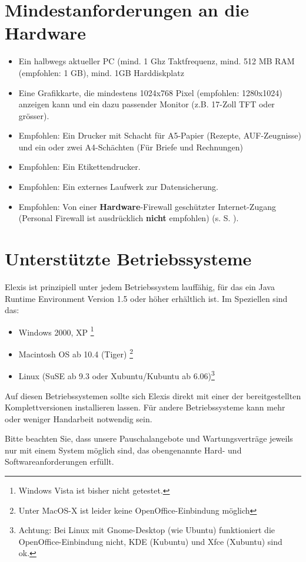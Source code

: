 %

\section{Mindestanforderungen an die Hardware}
\label{systemvoraussetzungen}
\begin{itemize}
 \item Ein halbwegs aktueller PC (mind. 1 Ghz Taktfrequenz, mind. 512 MB RAM
 (empfohlen: 1 GB), mind. 1GB Harddiskplatz
\item  Eine Grafikkarte, die mindestens 1024x768 Pixel (empfohlen: 1280x1024)
anzeigen kann und ein dazu passender Monitor (z.B. 17-Zoll TFT oder grösser).
\item Empfohlen: Ein Drucker mit Schacht für A5-Papier (Rezepte, AUF-Zeugnisse) und ein oder zwei A4-Schächten (Für Briefe und Rechnungen)
\item Empfohlen: Ein Etikettendrucker.
\item Empfohlen: Ein externes Laufwerk zur Datensicherung.
\item Empfohlen: Von einer \textbf{Hardware}-Firewall geschützter Internet-Zugang (Personal Firewall ist ausdrücklich \textbf{nicht} empfohlen) (s. S. \pageref{sicherheit}).
\end{itemize}

\section{Unterstützte Betriebssysteme}
Elexis ist prinzipiell unter jedem Betriebssystem lauffähig, für das ein Java Runtime Environment Version 1.5
oder höher erhältlich ist. Im Speziellen sind das:
\begin{itemize}
\item  Windows 2000, XP \footnote{Windows Vista ist bisher nicht getestet.}
\item  Macintosh OS ab 10.4 (Tiger)  \footnote{Unter MacOS-X ist leider keine
OpenOffice-Einbindung möglich}
\item Linux (SuSE ab 9.3 oder Xubuntu/Kubuntu ab 6.06)\footnote{Achtung: Bei Linux mit Gnome-Desktop (wie Ubuntu) funktioniert die OpenOffice-Einbindung nicht, KDE (Kubuntu) und Xfce (Xubuntu) sind ok.}
\end{itemize}
Auf diesen Betriebssystemen sollte sich Elexis direkt mit einer der bereitgestellten Komplettversionen installieren lassen. Für andere Betriebssysteme kann mehr oder weniger Handarbeit notwendig sein.

Bitte beachten Sie, dass unsere Pauschalangebote und Wartungsverträge jeweils nur mit einem System möglich sind, das obengenannte Hard- und  Softwareanforderungen erfüllt.
